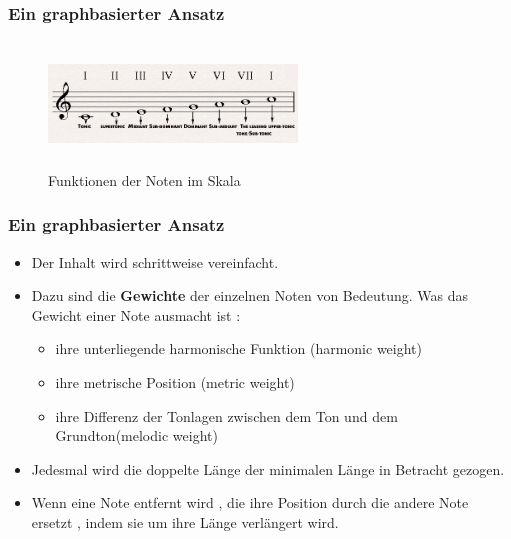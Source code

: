 \documentclass{beamer}
\begin{document}
	\begin{frame}
		\frametitle{Ein graphbasierter Ansatz}
		\begin{figure}[h!]
			\includegraphics[width=250px,height=125px,keepaspectratio]{functional_degrees}
			\caption{Funktionen der Noten im Skala \cite{functional_degrees_source}} 
		\end{figure}
	\end{frame}


	\begin{frame}
		\frametitle{Ein graphbasierter Ansatz}
		\begin{itemize}
				\item Der Inhalt wird schrittweise vereinfacht.
				\item Dazu sind die \textbf{Gewichte} der einzelnen Noten von Bedeutung. Was das Gewicht einer Note ausmacht ist : 
					\begin{itemize}
						\item ihre unterliegende harmonische Funktion (harmonic weight)
						\item ihre metrische Position (metric weight)
						\item ihre Differenz der Tonlagen zwischen dem Ton und dem Grundton(melodic weight)
					\end{itemize}
				\item Jedesmal wird die doppelte Länge der minimalen Länge in Betracht gezogen.
				\item Wenn eine Note entfernt wird , die ihre Position durch die andere Note ersetzt , indem sie um ihre Länge verlängert wird.
		\end{itemize}
	\end{frame}
	
\end{document}
